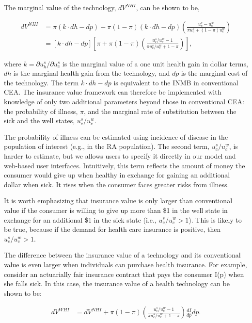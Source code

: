 \documentclass[11pt,final,fleqn]{article}\usepackage[]{graphicx}\usepackage[]{color}
\theoremstyle{plain}
\begin{document}
The marginal value of the technology, $dV^{NHI}$, can be shown to be,

\begin{align} 
dV^{NHI} &= \pi (k \cdot dh - dp) + \pi (1 - \pi)(k \cdot dh - dp)\left(\frac{u_c^s - u_c^w}{\pi u_c^s + (1-\pi)u_c^w} \right) \\
&= \left[k \cdot dh - dp\right] \left[\pi + \pi (1 - \pi)\left(\frac{u_c^s/u_c^w - 1}{\pi u_c^s/u_c^w + 1 - \pi}\right)\right],  \label{eqn:insurance-value}
\end{align}

where $k = \partial u_h^s/\partial u_c^s$ is the marginal value of a one unit health gain in dollar terms, $dh$ is the marginal health gain from the technology, and $dp$ is the marginal cost of the technology. The term $k \cdot dh - dp$ is equivalent to the INMB in conventional CEA. The insurance value framework can therefore be implemented with knowledge of only two additional parameters beyond those in conventional CEA: the probability of illness, $\pi$, and the marginal rate of substitution between the sick and the well states, $u_c^s/u_c^w$. 

The probability of illness can be estimated using incidence of disease in the population of interest (e.g., in the RA population). The second term, $u_c^s/u_c^w$, is harder to estimate, but we allows users to specify it directly in our model and web-based user interfaces. Intuitively, this term reflects the amount of money the consumer would give up when healthy in exchange for gaining an additional dollar when sick. It rises when the consumer faces greater risks from illness.

It is worth emphasizing that insurance value is only larger than conventional value if the consumer is willing to give up more than \$1 in the well state in exchange for an additional \$1 in the sick state (i.e., $u_c^s/u_c^w > 1$). This is likely to be true, because if the demand for health care insurance is positive, then $u_c^s/u_c^w > 1$.

The difference between the insurance value of a technology and its conventional value is even larger when individuals can purchase health insurance. For example, consider an actuarially fair insurance contract that pays the consumer I(p) when she falls sick. In this case, the insurance value of a health technology can be shown to be:

\begin{align}
dV^{WHI} &= dV^{NHI} + \pi (1 - \pi)\left(\frac{u_c^s/u_c^w - 1}{\pi u_c^s/u_c^w + 1 - \pi}\right)\frac{dI}{dp}dp.
\end{align}
\end{document}
